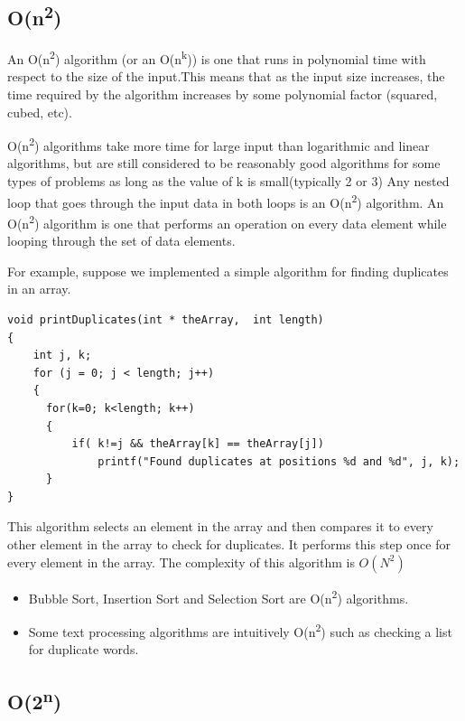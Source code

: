 \subsection{O(n\textsuperscript{2})}

An O(n\textsuperscript{2}) algorithm (or an
O(n\textsuperscript{k})) is one that runs in polynomial time with
respect to the size of the input.This means that as the input size
increases, the time required by the algorithm increases by some
polynomial factor (squared, cubed, etc).

O(n\textsuperscript{2}) algorithms take more time for
large input than logarithmic and linear algorithms, but are still
considered to be reasonably good algorithms for some types of problems as long as the value of k is small(typically 2 or 3)
Any nested loop that goes through the input data in both loops is an
O(n\textsuperscript{2}) algorithm.
An O(n\textsuperscript{2})
algorithm is one that performs an operation on every data element while looping through the set of data elements.  

For example,  suppose we implemented a simple algorithm for finding duplicates in an array.     

\begin{lstlisting}
void printDuplicates(int * theArray,  int length)
{
    int j, k;
    for (j = 0; j < length; j++)
    {
      for(k=0; k<length; k++)
      {
          if( k!=j && theArray[k] == theArray[j])
              printf("Found duplicates at positions %d and %d", j, k);
      }
}
\end{lstlisting}

This algorithm selects an element in the array and then compares it to every other element in the array to check for duplicates.  It performs this step once for every element in the array.     The complexity of this algorithm is $O(N^2)$

\begin{itemize}

\item Bubble Sort, Insertion Sort and Selection Sort are O(n\textsuperscript{2}) algorithms.\\
\item  Some text processing algorithms are intuitively  O(n\textsuperscript{2}) such as checking a list for duplicate words.
\end{itemize}



\subsection {O(2\textsuperscript{n})}

